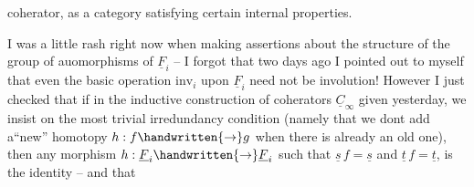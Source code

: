 coherator, as a category satisfying certain internal properties.

I was a little rash right now when making assertions about the structure of the group of auomorphisms of $\underline{F}_i$ -- I forgot that two days ago I pointed out to myself that even the basic operation $\mathrm{inv}_i$ upon $\underline{F}_i$ need not  be  involution!
However I just checked that if in the inductive construction of coherators $\underline{C}_{\infty}$ given yesterday, we insist on the most trivial irredundancy condition \deleted{\unsure{--}}(namely that we dont add a``new'' homotopy $h:f\handwritten{\to}g$ when there is already an old one), then any morphism $h:\underline{F}_i\handwritten{\to}\underline{F}_i$ such that $\underline{s}\,f=\underline{s}$ and $\underline{t}\,f=\underline{t}$, is the identity -- and that

